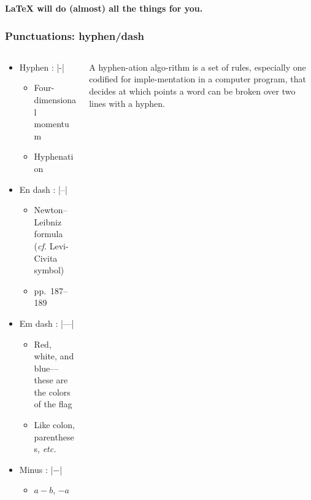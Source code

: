 \begin{frame}[standout]
  \large \textbf{\LaTeX{} will do (almost) all the things for you.}
\end{frame}

\begin{frame}[fragile]
\frametitle{Punctuations: hyphen/dash}
\begin{columns}
\begin{column}{0.84\textwidth}
  \begin{itemize}
    \item<1-> Hyphen : |-|
      \begin{itemize}
        \item Four-dimensional momentum
        \item Hyphenation
      \end{itemize}
    \item<3-> En dash : |--|
      \begin{itemize}
        \item Newton--Leibniz formula (\emph{cf.} Levi-Civita symbol)
        \item pp.~187--189
      \end{itemize}
    \item<4-> Em dash : |---|
      \begin{itemize}
        \item Red, white, and blue---these are the colors of the flag
        \item Like colon, parentheses, \emph{etc.}
      \end{itemize}
    \item<5-> Minus : |$-$|
      \begin{itemize}
        \item $a-b$, $-a$
      \end{itemize}
  \end{itemize}
\end{column}
\begin{column}{0.13\textwidth}
  \tiny\RaggedRight
  A hyphen\alert{-}ation algo\alert{-}rithm is a set of rules, especially one codified
  for imple\alert{-}mentation in a computer program, that decides at which points
  a word can be broken over two lines with a hyphen.
\end{column}
\end{columns}
\end{frame}


